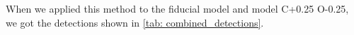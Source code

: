 \documentclass[twoside, single, authoryear, semicolon, 12pt]{lion-msc}
\newcommand{\4}{$_4$}
\newcommand{\3}{$_3$}
\newcommand{\2}{$_2$}
\begin{document}
When we applied this method to the fiducial model and model C+0.25 O-0.25, we got the detections shown in \autoref{tab: combined_detections}. 



\end{document}
